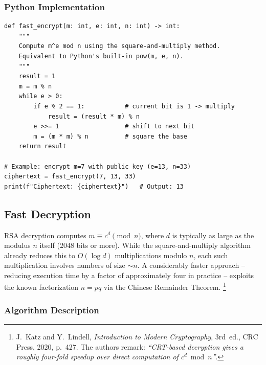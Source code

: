 \subsubsection*{Python Implementation}

\lstset{style=pythonstyle}
\begin{lstlisting}
def fast_encrypt(m: int, e: int, n: int) -> int:
    """
    Compute m^e mod n using the square-and-multiply method.
    Equivalent to Python's built-in pow(m, e, n).
    """
    result = 1
    m = m % n
    while e > 0:
        if e % 2 == 1:           # current bit is 1 -> multiply
            result = (result * m) % n
        e >>= 1                  # shift to next bit
        m = (m * m) % n          # square the base
    return result

# Example: encrypt m=7 with public key (e=13, n=33)
ciphertext = fast_encrypt(7, 13, 33)
print(f"Ciphertext: {ciphertext}")   # Output: 13
\end{lstlisting}


\subsection{Fast Decryption}
\label{subsec:fast-dec}


RSA decryption computes $m \equiv c^d \pmod{n}$, where $d$ is typically as large as the
modulus $n$ itself (2048 bits or more). While the square-and-multiply algorithm already
reduces this to $O(\log d)$ multiplications modulo $n$, each such multiplication involves
numbers of size $\sim n$. A considerably faster approach -- reducing execution time by a
factor of approximately four in practice -- exploits the known factorization $n = pq$ via
the Chinese Remainder Theorem.
\footnote{J.~Katz and Y.~Lindell, \textit{Introduction to Modern Cryptography}, 3rd~ed.,
CRC Press, 2020, p.~427.
The authors remark: \textit{``CRT-based decryption gives a roughly four-fold speedup
over direct computation of $c^d \bmod n$''}.}

\subsubsection*{Algorithm Description}


